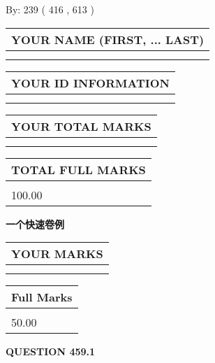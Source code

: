 \documentclass{ctexart}
\begin{document}
   
\hspace{1.0in} By: 
 239 ( 416 ,  613 )
   
   
   
   
\newpage 
\setcounter{page}{ 
   459001 } 
   
   
   
   
\noindent\begin{tabular}{|l|}
\hline
YOUR NAME (FIRST, ... LAST)  \\
\hline
 \\ 
 \\ 
\hline
\end{tabular}
\hspace{0.05in} \begin{tabular}{|l|}
\hline
 YOUR   ID   INFORMATION  \\
\hline
 \\ 
 \\ 
\hline
\end{tabular}
   
   
\vspace{0.2in}\noindent\begin{tabular}{|l|}
\hline
YOUR TOTAL MARKS  \\
\hline
 \\ 
 \\ 
\hline
\end{tabular}
\hspace{0.05in} \begin{tabular}{|l|}
\hline
TOTAL FULL MARKS  \\
\hline
 \\ 
100.00 \\
\hline
\end{tabular}
   
   
 \vspace{0.2in}
{\LARGE {\textbf{ 一个快速卷例}}}
   
   
  
\vspace{0.2in}
  
\noindent\begin{tabular}{|l|}
\hline
 YOUR MARKS  \\
\hline
 \\ 
 \\ 
\hline
\end{tabular}
\hspace{0.05in} \begin{tabular}{|l|}
\hline
 Full Marks  \\
\hline
 \\ 
50.00 \\
\hline
\end{tabular}
{\textbf{\Large{QUESTION
459.1 
}}}
  
\end{document}
